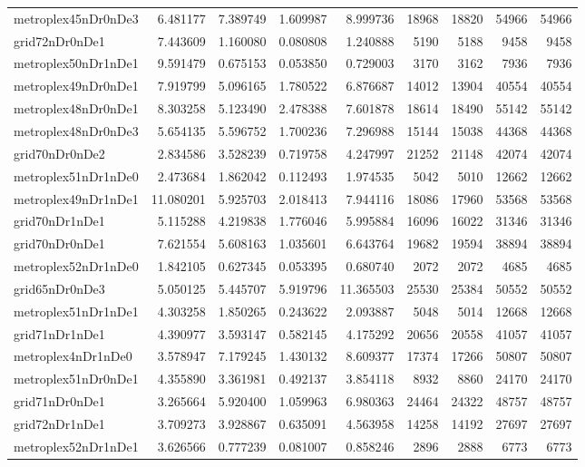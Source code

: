 \begin{longtable}{|l|r|r|r|r|r|r|r|r|}
metroplex45nDr0nDe3 & 6.481177 & 7.389749 & 1.609987 & 8.999736 & 18968 & 18820 & 54966 & 54966 \\
grid72nDr0nDe1 & 7.443609 & 1.160080 & 0.080808 & 1.240888 & 5190 & 5188 & 9458 & 9458 \\
metroplex50nDr1nDe1 & 9.591479 & 0.675153 & 0.053850 & 0.729003 & 3170 & 3162 & 7936 & 7936 \\
metroplex49nDr0nDe1 & 7.919799 & 5.096165 & 1.780522 & 6.876687 & 14012 & 13904 & 40554 & 40554 \\
metroplex48nDr0nDe1 & 8.303258 & 5.123490 & 2.478388 & 7.601878 & 18614 & 18490 & 55142 & 55142 \\
metroplex48nDr0nDe3 & 5.654135 & 5.596752 & 1.700236 & 7.296988 & 15144 & 15038 & 44368 & 44368 \\
grid70nDr0nDe2 & 2.834586 & 3.528239 & 0.719758 & 4.247997 & 21252 & 21148 & 42074 & 42074 \\
metroplex51nDr1nDe0 & 2.473684 & 1.862042 & 0.112493 & 1.974535 & 5042 & 5010 & 12662 & 12662 \\
metroplex49nDr1nDe1 & 11.080201 & 5.925703 & 2.018413 & 7.944116 & 18086 & 17960 & 53568 & 53568 \\
grid70nDr1nDe1 & 5.115288 & 4.219838 & 1.776046 & 5.995884 & 16096 & 16022 & 31346 & 31346 \\
grid70nDr0nDe1 & 7.621554 & 5.608163 & 1.035601 & 6.643764 & 19682 & 19594 & 38894 & 38894 \\
metroplex52nDr1nDe0 & 1.842105 & 0.627345 & 0.053395 & 0.680740 & 2072 & 2072 & 4685 & 4685 \\
grid65nDr0nDe3 & 5.050125 & 5.445707 & 5.919796 & 11.365503 & 25530 & 25384 & 50552 & 50552 \\
metroplex51nDr1nDe1 & 4.303258 & 1.850265 & 0.243622 & 2.093887 & 5048 & 5014 & 12668 & 12668 \\
grid71nDr1nDe1 & 4.390977 & 3.593147 & 0.582145 & 4.175292 & 20656 & 20558 & 41057 & 41057 \\
metroplex4nDr1nDe0 & 3.578947 & 7.179245 & 1.430132 & 8.609377 & 17374 & 17266 & 50807 & 50807 \\
metroplex51nDr0nDe1 & 4.355890 & 3.361981 & 0.492137 & 3.854118 & 8932 & 8860 & 24170 & 24170 \\
grid71nDr0nDe1 & 3.265664 & 5.920400 & 1.059963 & 6.980363 & 24464 & 24322 & 48757 & 48757 \\
grid72nDr1nDe1 & 3.709273 & 3.928867 & 0.635091 & 4.563958 & 14258 & 14192 & 27697 & 27697 \\
metroplex52nDr1nDe1 & 3.626566 & 0.777239 & 0.081007 & 0.858246 & 2896 & 2888 & 6773 & 6773 \\

\end{longtable}
